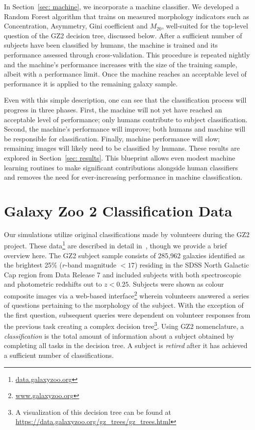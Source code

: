 \documentclass[twocolumn,  trackchanges, ]{aastex6}%
\newcommand{\M}[1]{$M_{\mathrm{#1}}$}
\begin{document}
In Section~\ref{sec: machine}, we incorporate a machine classifier. We developed a Random Forest algorithm that trains on measured morphology indicators such as Concentration, Asymmetry, Gini coefficient and \M{20}, well-suited for the top-level question of the GZ2 decision tree, discussed below. After a sufficient number of subjects have been classified by humans,  the machine is trained and its performance assessed through cross-validation. This procedure is repeated nightly and the machine's performance increases with the size of the training sample, albeit with a performance limit. Once the machine reaches an acceptable level of performance it is applied to the remaining galaxy sample. 

Even with this simple description, one can see that the classification process will progress in three phases.  First, the machine will not yet have reached an acceptable level of performance; only humans contribute to subject classification. Second, the machine's performance will improve; both humans and machine will be responsible for classification. Finally, machine performance will slow; remaining images will likely need to be classified by humans. These results are explored in  Section~\ref{sec: results}. This blueprint allows even modest machine learning routines to make significant contributions alongside human classifiers and removes the need for ever-increasing performance in machine classification.

\section{Galaxy Zoo 2 Classification Data} \label{sec: data}

Our simulations utilize original classifications made by volunteers during the GZ2 project. These data\footnote{\url{data.galaxyzoo.org}} are described in detail in~\cite{Willett2013}, though we provide a brief overview here.  The GZ2 subject sample consists of 285,962 galaxies identified as the brightest 25\% ($r$-band magnitude $< 17$) residing in the SDSS North Galactic Cap region from Data Release 7 and included subjects with both spectroscopic and photometric redshifts out to $z < 0.25$. Subjects were shown as colour composite images via a web-based interface\footnote{\url{www.galaxyzoo.org}} wherein volunteers answered a series of questions pertaining to the morphology of the subject. With the exception of the first question, subsequent queries were dependent on volunteer responses from the previous task creating a complex decision tree\footnote{A visualization of this decision tree can be found at \url{https://data.galaxyzoo.org/gz_trees/gz_trees.html}}. Using GZ2 nomenclature, a \textit{classification} is the total amount of information about a subject obtained by completing all tasks in the decision tree. A subject is \textit{retired} after it has achieved a sufficient number of classifications.
\end{document}
